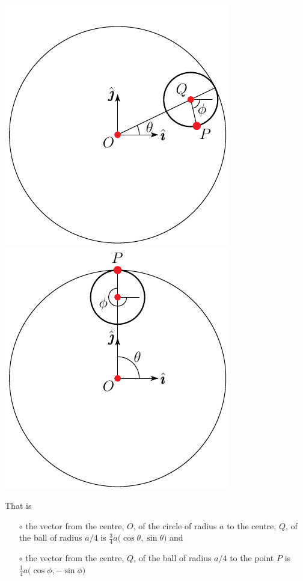 \begin{wfig}
\begin{center}
     \includegraphics{astroid.pdf}\qquad\qquad
     \includegraphics{astroid3.pdf}
\end{center}
\end{wfig}
\noindent That is 
\begin{itemize}\itemsep1pt \parskip0pt  %
\item[$\circ$]
the vector from the centre, $O$, of the circle of radius
$a$ to the centre, $Q$, of the ball of radius $a/4$ is
$
\frac{3}{4}a\big(\cos\theta,\sin\theta\big)
$
and
\item[$\circ$] the vector from the centre, $Q$, of the ball of radius $a/4$ to
the point $P$ is
$
\frac{1}{4}a\big(\cos\phi,-\sin\phi\big)
$
\end{itemize}
